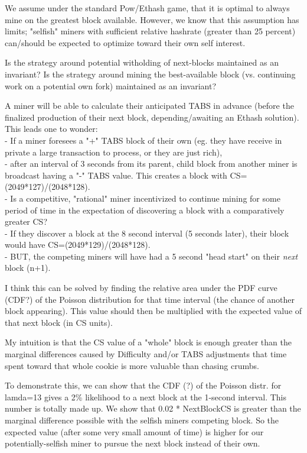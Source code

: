 \documentclass[11pt]{article}
\theoremstyle{plain}
\begin{document}
We assume under the standard Pow/Ethash game, that it is optimal to always mine
on the greatest block available.
However, we know that this assumption has limits; "selfish" miners with
sufficient relative hashrate (greater than 25 percent) can/should be expected
to optimize toward their own self interest.

Is the strategy around potential witholding of next-blocks maintained as an
invariant?
Is the strategy around mining the best-available block (vs. continuing work on
a potential own fork) maintained as an invariant?

A miner will be able to calculate their anticipated TABS in advance (before the
finalized production of their next block, depending/awaiting an Ethash
solution).
This leads one to wonder: \\
- If a miner foresees a "+" TABS block of their own (eg. they have receive in
private a large transaction to process, or they are just rich), \\
- after an interval of 3 seconds from its parent, child block from another
miner is broadcast having a "-" TABS value. This creates a block with
CS=(2049*127)/(2048*128). \\
- Is a competitive, "rational" miner incentivized to continue mining for some
period of time in the expectation of discovering a block with a comparatively
greater CS? \\
    - If they discover a block at the 8 second interval (5 seconds later),
their block would have CS=(2049*129)/(2048*128). \\
    - BUT, the competing miners will have had a 5 second "head start" on their
\textit{next} block (n+1).

I think this can be solved by finding the relative area under the PDF curve
(CDF?) of the Poisson distribution for that time interval (the chance of
another block appearing).
This value should then be multiplied with the expected value of that next block
(in CS units).

My intuition is that the CS value of a "whole" block is enough greater than the
marginal differences caused by Difficulty and/or TABS adjustments that time
spent toward that whole cookie is more valuable than chasing crumbs.

To demonstrate this, we can show that the CDF (?) of the Poisson distr. for
lamda=13 gives a 2\% likelihood to a next block at the 1-second interval. This
number is totally made up.
We show that 0.02 * NextBlockCS is greater than the marginal difference
possible with the selfish miners competing block.
So the expected value (after some very small amount of time) is higher for our
potentially-selfish miner to pursue the next block instead of their own.
\end{document}
